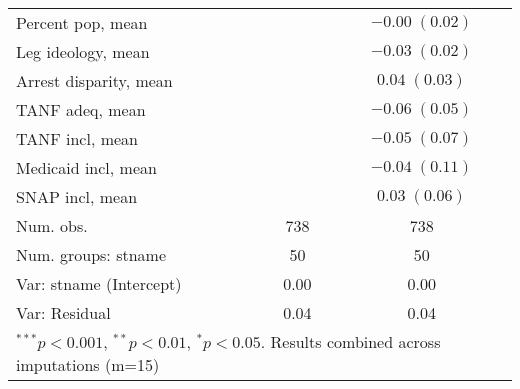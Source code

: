 \begin{table}
\begin{center}
\begin{tabular}{l c c }
Percent pop, mean          &                        & $-0.00 \; (0.02)$      \\
Leg ideology, mean         &                        & $-0.03 \; (0.02)$      \\
Arrest disparity, mean     &                        & $0.04 \; (0.03)$       \\
TANF adeq, mean            &                        & $-0.06 \; (0.05)$      \\
TANF incl, mean            &                        & $-0.05 \; (0.07)$      \\
Medicaid incl, mean        &                        & $-0.04 \; (0.11)$      \\
SNAP incl, mean            &                        & $0.03 \; (0.06)$       \\
\hline
Num. obs.                  & 738                    & 738                    \\
Num. groups: stname        & 50                     & 50                     \\
Var: stname (Intercept)    & 0.00                   & 0.00                   \\
Var: Residual              & 0.04                   & 0.04                   \\
\hline
\multicolumn{3}{l}{\scriptsize{$^{***}p<0.001$, $^{**}p<0.01$, $^*p<0.05$. Results combined across imputations (m=15)}}
\end{tabular}
\label{table:coefficients}
\end{center}
\end{table}
